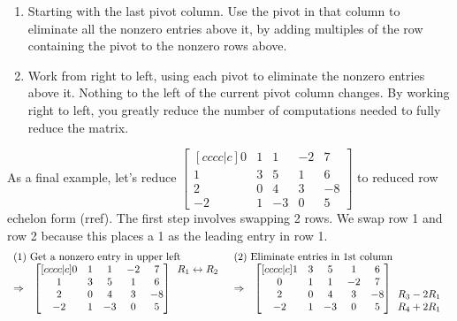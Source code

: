 \begin{enumerate}
\begin{enumerate}
	\item Starting with the last pivot column. Use the pivot in that column to eliminate all the nonzero entries above it, by adding multiples of the row containing the pivot to the nonzero rows above. 
	\item Work from right to left, using each pivot to eliminate the nonzero entries above it. Nothing to the left of the current pivot column changes.  By working right to left, you greatly reduce the number of computations needed to fully reduce the matrix.
\end{enumerate}
\end{enumerate}


\begin{example}\label{ex rref last}
As a final example, let's reduce 
{\small $
\begin{bmatrix}[cccc|c]
 0 & 1 & 1 & -2 & 7 \\
  1 & 3 & 5 & 1 & 6 \\
 2 & 0 & 4 & 3 & -8 \\
 -2 & 1 & -3 & 0 & 5
\end{bmatrix}
$} to reduced row echelon form (rref). The first step involves swapping 2 rows. We swap row 1 and row 2 because this places a 1 as the leading entry in row 1.
{\small  $$\begin{array}{rlcl}
\multicolumn{2}{l}{\text{(1) Get a nonzero entry in upper left}}&
\multicolumn{2}{l}{\text{(2) Eliminate entries in 1st column}}\\
\Rightarrow&
\begin{bmatrix}[cccc|c]
 0 & 1 & 1 & -2 & 7 \\
  1 & 3 & 5 & 1 & 6 \\
 2 & 0 & 4 & 3 & -8 \\
 -2 & 1 & -3 & 0 & 5
\end{bmatrix}
  \begin{array}{lr} R_1\leftrightarrow R_2 \\ \ \\ \ \\ \ \end{array}
&\Rightarrow& 
\begin{bmatrix}[cccc|c]
  1 & 3 & 5 & 1 & 6 \\
 0 & 1 & 1 & -2 & 7 \\
 2 & 0 & 4 & 3 & -8 \\
 -2 & 1 & -3 & 0 & 5
\end{bmatrix}
  \begin{array}{lr} \ \\ \ \\ R_3-2R_1 \\ R_4+2R_1 \end{array}

\end{array}$$}
\end{example}
